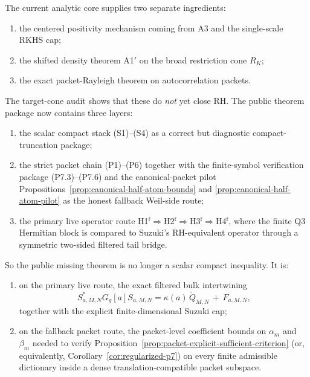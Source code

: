 \begin{remark}
The current analytic core supplies two separate ingredients:
\begin{enumerate}
  \item the centered positivity mechanism coming from A3 and the single-scale RKHS cap;
  \item the shifted density theorem A1$'$ on the broad restriction cone $R_K$;
  \item the exact packet-Rayleigh theorem on autocorrelation packets.
\end{enumerate}
The target-cone audit shows that these do \emph{not} yet close RH. The public
theorem package now contains three layers:
\begin{enumerate}
  \item the scalar compact stack \textup{(S1)}--\textup{(S4)} as a correct but
  diagnostic compact-truncation package;
  \item the strict packet chain \textup{(P1)}--\textup{(P6)} together with the
  finite-symbol verification package \textup{(P7.3)}--\textup{(P7.6)} and the
  canonical-packet pilot
  Propositions~\ref{prop:canonical-half-atom-bounds} and
  \ref{prop:canonical-half-atom-pilot} as the honest fallback Weil-side route;
  \item the primary live operator route
  \textup{H1}$^{\mathrm f}\Rightarrow$\textup{H2}$^{\mathrm f}
  \Rightarrow$\textup{H3}$^{\mathrm f}\Rightarrow$\textup{H4}$^{\mathrm f}$,
  where the finite Q3 Hermitian block is compared to Suzuki's
  RH-equivalent operator through a symmetric two-sided filtered tail bridge.
\end{enumerate}
So the public missing theorem is no longer a scalar compact inequality. It is:
\begin{enumerate}
  \item on the primary live route, the exact filtered bulk intertwining
  \[
    S_{a,M,N}^*G_g[a]S_{a,M,N}
    =
    \kappa(a)\,\widetilde Q_{M,N}
    \,+\, F_{a,M,N},
  \]
  together with the explicit finite-dimensional Suzuki cap;
  \item on the fallback packet route, the packet-level coefficient bounds on
  $\alpha_m$ and $\beta_m$ needed to verify
  Proposition~\ref{prop:packet-explicit-sufficient-criterion}
  (or, equivalently, Corollary~\ref{cor:regularized-p7}) on every finite
  admissible dictionary inside a dense translation-compatible packet subspace.
\end{enumerate}
\end{remark}

